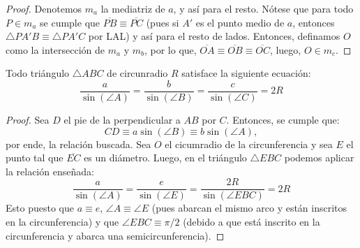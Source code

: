 \documentclass[11pt,a4paper]{book}
\begin{document}
\begin{proof}
	Denotemos $m_a$ la mediatriz de $a$, y así para el resto. Nótese que para todo $P\in m_a$ se cumple que $\overline{PB}\equiv\overline{PC}$ (pues si $A'$ es el punto medio de $a$, entonces $\triangle PA'B\equiv\triangle PA'C$ por LAL) y así para el resto de lados. Entonces, definamos $O$ como la intersección de $m_a$ y $m_b$, por lo que, $\overline{OA}\equiv\overline{OB}\equiv\overline{OC}$, luego, $O\in m_c$.
\end{proof}
\begin{thm}
Todo triángulo $\triangle ABC$ de circunradio $R$ satisface la siguiente ecuación:
	\begin{equation}
		\frac{a}{\sin(\angle A)}=\frac{b}{\sin(\angle B)}=\frac{c}{\sin(\angle C)}=2R
	\end{equation}
\end{thm}
\begin{proof}
Sea $D$ el pie de la perpendicular a $AB$ por $C$. Entonces, se cumple que:
$$CD \equiv a \sin(\angle B) \equiv b \sin(\angle A),$$
	por ende, la relación buscada. Sea $O$ el cicumradio de la circunferencia y sea $E$ el punto tal que $\overline{EC}$ es un diámetro. Luego, en el triángulo $\triangle EBC$ podemos aplicar la relación enseñada:
	$$\frac{a}{\sin(\angle A)}=\frac{e}{\sin(\angle E)}=\frac{2R}{\sin(\angle EBC)}=2R$$
Esto puesto que $a \equiv e$, $\angle A \equiv \angle E$ (pues abarcan el mismo arco y están inscritos en la circunferencia) y que $\angle EBC \equiv \pi/2$ (debido a que está inscrito en la circunferencia y abarca una semicircunferencia).
\end{proof}
\end{document}
